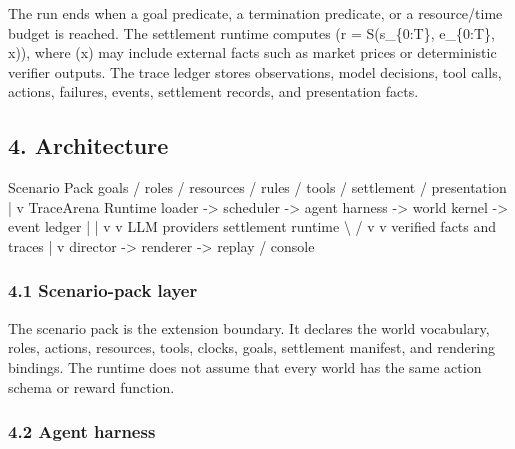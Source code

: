 \documentclass[
]{article}
\newenvironment{Shaded}{}{}
\newcommand{\NormalTok}[1]{#1}
\begin{document}
The run ends when a goal predicate, a termination predicate, or a
resource/time budget is reached. The settlement runtime computes (r =
S(s\_\{0:T\}, e\_\{0:T\}, x)), where (x) may include external facts such
as market prices or deterministic verifier outputs. The trace ledger
stores observations, model decisions, tool calls, actions, failures,
events, settlement records, and presentation facts.

\subsection{4. Architecture}\label{4-architecture}

\begin{Shaded}
\begin{Highlighting}[]
\NormalTok{Scenario Pack}
\NormalTok{  goals / roles / resources / rules / tools / settlement / presentation}
\NormalTok{                              |}
\NormalTok{                              v}
\NormalTok{TraceArena Runtime}
\NormalTok{  loader {-}\textgreater{} scheduler {-}\textgreater{} agent harness {-}\textgreater{} world kernel {-}\textgreater{} event ledger}
\NormalTok{                                      |                 |}
\NormalTok{                                      v                 v}
\NormalTok{                               LLM providers       settlement runtime}
\NormalTok{                                      \textbackslash{}                 /}
\NormalTok{                                       v               v}
\NormalTok{                                  verified facts and traces}
\NormalTok{                                             |}
\NormalTok{                                             v}
\NormalTok{                              director {-}\textgreater{} renderer {-}\textgreater{} replay / console}
\end{Highlighting}
\end{Shaded}

\subsubsection{4.1 Scenario-pack layer}\label{41-scenario-pack-layer}

The scenario pack is the extension boundary. It declares the world
vocabulary, roles, actions, resources, tools, clocks, goals, settlement
manifest, and rendering bindings. The runtime does not assume that every
world has the same action schema or reward function.

\subsubsection{4.2 Agent harness}\label{42-agent-harness}
\end{document}
